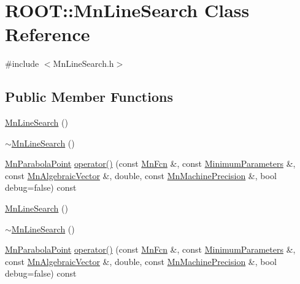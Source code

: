 \hypertarget{classROOT_1_1Minuit2_1_1MnLineSearch}{}\section{R\+O\+OT\+:\+:Mn\+Line\+Search Class Reference}
\label{classROOT_1_1Minuit2_1_1MnLineSearch}


{\ttfamily \#include $<$Mn\+Line\+Search.\+h$>$}

\subsection*{Public Member Functions}
\begin{DoxyCompactItemize}
\item 
\mbox{\hyperlink{classROOT_1_1Minuit2_1_1MnLineSearch_ac8e8d450c628b3af3becdfc1badd0180}{Mn\+Line\+Search}} ()
\item 
\mbox{\hyperlink{classROOT_1_1Minuit2_1_1MnLineSearch_a84ecd0790b8822023e2e1d7abb102f6c}{$\sim$\+Mn\+Line\+Search}} ()
\item 
\mbox{\hyperlink{classROOT_1_1Minuit2_1_1MnParabolaPoint}{Mn\+Parabola\+Point}} \mbox{\hyperlink{classROOT_1_1Minuit2_1_1MnLineSearch_a4caf80e70d50f3bfa149d28836d26a95}{operator()}} (const \mbox{\hyperlink{classROOT_1_1Minuit2_1_1MnFcn}{Mn\+Fcn}} \&, const \mbox{\hyperlink{classROOT_1_1Minuit2_1_1MinimumParameters}{Minimum\+Parameters}} \&, const \mbox{\hyperlink{namespaceROOT_1_1Minuit2_a62ed97730a1ca8d3fbaec64a19aa11c9}{Mn\+Algebraic\+Vector}} \&, double, const \mbox{\hyperlink{classROOT_1_1Minuit2_1_1MnMachinePrecision}{Mn\+Machine\+Precision}} \&, bool debug=false) const
\item 
\mbox{\hyperlink{classROOT_1_1Minuit2_1_1MnLineSearch_ac8e8d450c628b3af3becdfc1badd0180}{Mn\+Line\+Search}} ()
\item 
\mbox{\hyperlink{classROOT_1_1Minuit2_1_1MnLineSearch_a84ecd0790b8822023e2e1d7abb102f6c}{$\sim$\+Mn\+Line\+Search}} ()
\item 
\mbox{\hyperlink{classROOT_1_1Minuit2_1_1MnParabolaPoint}{Mn\+Parabola\+Point}} \mbox{\hyperlink{classROOT_1_1Minuit2_1_1MnLineSearch_a4caf80e70d50f3bfa149d28836d26a95}{operator()}} (const \mbox{\hyperlink{classROOT_1_1Minuit2_1_1MnFcn}{Mn\+Fcn}} \&, const \mbox{\hyperlink{classROOT_1_1Minuit2_1_1MinimumParameters}{Minimum\+Parameters}} \&, const \mbox{\hyperlink{namespaceROOT_1_1Minuit2_a62ed97730a1ca8d3fbaec64a19aa11c9}{Mn\+Algebraic\+Vector}} \&, double, const \mbox{\hyperlink{classROOT_1_1Minuit2_1_1MnMachinePrecision}{Mn\+Machine\+Precision}} \&, bool debug=false) const
\end{DoxyCompactItemize}


